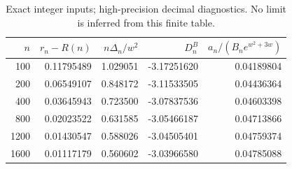 \begin{table}[htbp]\centering\small\begin{tabular}{rrrrr}\toprule
$n$ & $r_n-R(n)$ & $n\Delta_n/w^2$ & $D_n^B$ & $a_n/(B_ne^{w^2+3w})$ \\ \midrule
100 & 0.11795489 & 1.029051 & -3.17251620 & 0.04189804 \\
200 & 0.06549107 & 0.848172 & -3.11533505 & 0.04436364 \\
400 & 0.03645943 & 0.723500 & -3.07837536 & 0.04603398 \\
800 & 0.02023522 & 0.631585 & -3.05466187 & 0.04713866 \\
1200 & 0.01430547 & 0.588026 & -3.04505401 & 0.04759374 \\
1600 & 0.01117179 & 0.560602 & -3.03966580 & 0.04785088 \\
\bottomrule\end{tabular}\caption{Exact integer inputs; high-precision decimal diagnostics. No limit is inferred from this finite table.}\end{table}
